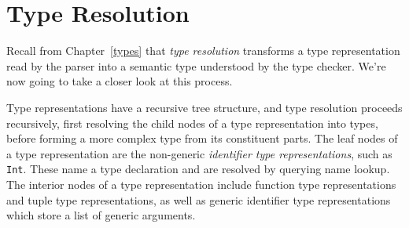 \documentclass[../generics]{subfiles}
\begin{document}
\chapter{Type Resolution}\label{typeresolution}

Recall from Chapter~\ref{types} that \emph{type resolution} transforms a type representation read by the parser into a semantic type understood by the type checker. We're now going to take a closer look at this process.

Type representations have a recursive tree structure, and type resolution proceeds recursively, first resolving the child nodes of a type representation into types, before forming a more complex type from its constituent parts. The leaf nodes of a type representation are the non-generic \emph{identifier type representations}, such as \texttt{Int}. These name a type declaration and are resolved by querying name lookup. The interior nodes of a type representation include function type representations and tuple type representations, as well as generic identifier type representations which store a list of generic arguments.
\end{document}

